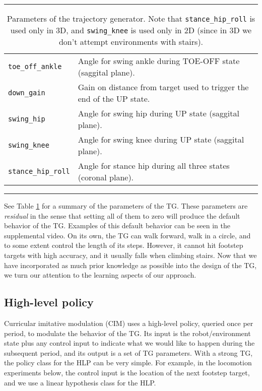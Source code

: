 \documentclass[a4paper]{article}
\begin{document}
\begin{table}
  \caption{Parameters of the trajectory generator.
  Note that \texttt{stance\_hip\_roll} is used only in 3D, and \texttt{swing\_knee} is used only in 2D (since in 3D we don't attempt environments with stairs).}
  \label{table:params}
  \hrule
  \begin{tabular}{ll}
    \texttt{toe\_off\_ankle} & Angle for swing ankle during TOE-OFF state (saggital plane). \\
    \texttt{down\_gain} & Gain on distance from target used to trigger the end of the UP state. \\
    \texttt{swing\_hip} & Angle for swing hip during UP state (saggital plane). \\
    \texttt{swing\_knee} & Angle for swing knee during UP state (saggital plane). \\
    \texttt{stance\_hip\_roll} & Angle for stance hip during all three states (coronal plane). \\
  \end{tabular}
  \hrule
\end{table}

See Table \ref{table:params} for a summary of the parameters of the TG.
These parameters are \emph{residual} in the sense that setting all of them to zero will produce the default behavior of the TG.
Examples of this default behavior can be seen in the supplemental video.
On its own, the TG can walk forward, walk in a circle, and to some extent control the length of its steps.
However, it cannot hit footstep targets with high accuracy, and it usually falls when climbing stairs.
Now that we have incorporated as much prior knowledge as possible into the design of the TG, we turn our attention to the learning aspects of our approach.

\subsection{High-level policy}

Curricular imitative modulation (CIM) uses a high-level policy, queried once per period, to modulate the behavior of the TG.
Its input is the robot/environment state plus any control input to indicate what we would like to happen during the subsequent period, and
its output is a set of TG parameters.
With a strong TG, the policy class for the HLP can be very simple.
For example, in the locomotion experiments below, the control input is the location of the next footstep target,
and we use a linear hypothesis class for the HLP.
\end{document}
